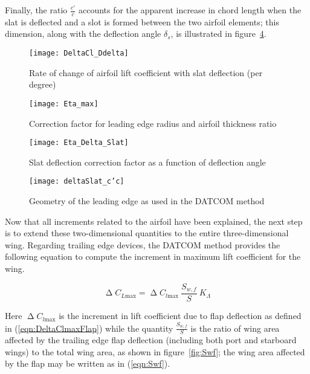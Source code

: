 Finally, the ratio $\frac{c'}{c}$ accounts for the apparent increase in chord length when the slat is deflected and a slot is formed between the two airfoil elements; this dimension, along with the deflection angle $\delta_s$, is illustrated in figure~\ref{fig:c'c_deltaSlat}.

\begin{figure}[H]
  \centering
  \texttt{[image: DeltaCl\_Ddelta]}
  \caption{Rate of change of airfoil lift coefficient with slat deflection (per degree)}
  \label{fig:dCldDelta}
\end{figure}

\begin{figure}[H]
  \centering
  \texttt{[image: Eta\_max]}
  \caption{Correction factor for leading edge radius and airfoil thickness ratio}
  \label{fig:etaDeltaMaxSlat}
\end{figure}

\begin{figure}[H]
  \centering
  \texttt{[image: Eta\_Delta\_Slat]}
  \caption{Slat deflection correction factor as a function of deflection angle}
  \label{fig:etaDeltaSlat}
\end{figure}

\begin{figure}[H]
  \centering
  \texttt{[image: deltaSlat\_c'c]}
  \caption{Geometry of the leading edge as used in the DATCOM method}
  \label{fig:c'c_deltaSlat}
\end{figure}

\noindent
Now that all increments related to the airfoil have been explained, the next step is to extend these two-dimensional quantities to the entire three-dimensional wing.
Regarding trailing edge devices, the \gls{DATCOM} method provides the following equation to compute the increment in maximum lift coefficient for the wing.

\begin{equation}
\upDelta C_{L\text{max}}=\upDelta C_{l\text{max}}\ \dfrac{S_{w,f}}{S}\ K_\Lambda
\label{eqn:DeltaCLmaxFlap}
\end{equation}

\noindent
Here $\upDelta C_{l\text{max}}$ is the increment in lift coefficient due to flap deflection as defined in (\ref{eqn:DeltaClmaxFlap}) while the quantity $\frac{S_{w,f}}{S}$ is the ratio of wing area affected by the trailing edge flap deflection (including both port and starboard wings) to the total wing area, as shown in figure~\ref{fig:Swf}; the wing area affected by the flap may be written as in (\ref{eqn:Swf}).

